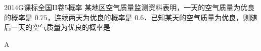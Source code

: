 
\begin{problem}{2014}{G}{课标全国II卷}{5}{概率}
某地区空气质量监测资料表明，一天的空气质量为优良的概率是 $ 0.75 $，连续两天为优良的概率是 $ 0.6 $．已知某天的空气质量为优良，则随后一天的空气质量为优良的概率是
\begin{choices}
\end{choices}
\end{problem}

\begin{answer}
A
\end{answer}

\begin{solutions}

\end{solutions}